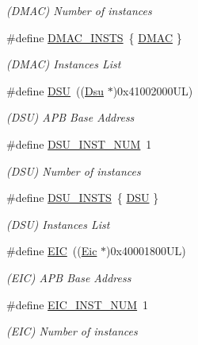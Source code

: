 \begin{DoxyCompactItemize}
\begin{DoxyCompactList}\small\item\em (D\+M\+AC) Number of instances \end{DoxyCompactList}\item 
\#define \mbox{\hyperlink{group___s_a_m_d21_e15_l__base_gab1e67e0f9f094c76ae0740cd030b4326}{D\+M\+A\+C\+\_\+\+I\+N\+S\+TS}}~\{ \mbox{\hyperlink{group___s_a_m_d21_j18_a__base_ga9f8bc0e77445ff4bc6fc2db5c2828667}{D\+M\+AC}} \}
\begin{DoxyCompactList}\small\item\em (D\+M\+AC) Instances List \end{DoxyCompactList}\item 
\#define \mbox{\hyperlink{group___s_a_m_d21_e15_l__base_ga64552f972ce1670686fb30eb48ae1797}{D\+SU}}~((\mbox{\hyperlink{struct_dsu}{Dsu}}      $\ast$)0x41002000\+U\+L)
\begin{DoxyCompactList}\small\item\em (D\+SU) A\+PB Base Address \end{DoxyCompactList}\item 
\#define \mbox{\hyperlink{group___s_a_m_d21_e15_l__base_ga6496ebdaeee317b3afd0e1d867a12318}{D\+S\+U\+\_\+\+I\+N\+S\+T\+\_\+\+N\+UM}}~1
\begin{DoxyCompactList}\small\item\em (D\+SU) Number of instances \end{DoxyCompactList}\item 
\#define \mbox{\hyperlink{group___s_a_m_d21_e15_l__base_gaf0d80f8f8a1e7a6320587be7defa5fbe}{D\+S\+U\+\_\+\+I\+N\+S\+TS}}~\{ \mbox{\hyperlink{group___s_a_m_d21_j18_a__base_ga64552f972ce1670686fb30eb48ae1797}{D\+SU}} \}
\begin{DoxyCompactList}\small\item\em (D\+SU) Instances List \end{DoxyCompactList}\item 
\#define \mbox{\hyperlink{group___s_a_m_d21_e15_l__base_ga27183a94584b5fca7e1207ce7a79782a}{E\+IC}}~((\mbox{\hyperlink{struct_eic}{Eic}}      $\ast$)0x40001800\+U\+L)
\begin{DoxyCompactList}\small\item\em (E\+IC) A\+PB Base Address \end{DoxyCompactList}\item 
\#define \mbox{\hyperlink{group___s_a_m_d21_e15_l__base_ga60399071a15698b02e60c024082fcaee}{E\+I\+C\+\_\+\+I\+N\+S\+T\+\_\+\+N\+UM}}~1
\begin{DoxyCompactList}\small\item\em (E\+IC) Number of instances \end{DoxyCompactList}\item 

\end{DoxyCompactItemize}
